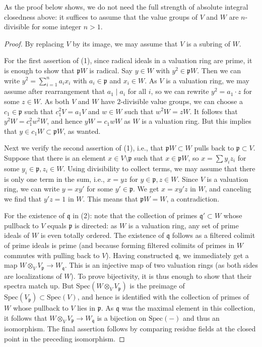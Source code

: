 \documentclass[reqno]{amsart}
\theoremstyle{definition}
\begin{document}
As the proof below shows, we do not need the full strength of absolute integral closedness above: it suffices to assume that the value groups of $V$ and $W$ are $n$-divisible for some integer $n > 1$. 

\begin{proof}
By replacing $V$ by its image, we may assume that $V$ is a subring of $W$. 

For the first assertion of (1), since radical ideals in a valuation ring are prime, it is enough to
show that $\mathfrak{p}W$ is radical. Say $y \in W$ with $y^2 \in
\mathfrak{p}W$. Then we can write $y^2 = \sum_{i=1}^n a_i x_i$ with $a_i \in
\mathfrak{p}$ and $x_i \in W$. As $V$ is a valuation ring, we may assume after
rearrangement that $a_1 \mid a_i$ for all $i$, so we can rewrite $y^2 = a_1
\cdot z$ for some $z \in W$. As both $V$ and $W$ have $2$-divisible value
groups, we can choose a $c_1 \in \mathfrak{p}$ such that $c_1^2V = a_1V$ and $w
\in W$ such that $w^2W = zW$. It follows that $y^2 W = c_1^2 w^2W$, and hence
$yW = c_1w W$ as $W$ is a valuation ring. But this implies that $y \in c_1W \subset \mathfrak{p}W$, as wanted.

Next we verify the second assertion of (1), i.e., that $\mathfrak{p} W \subset W$ pulls back to $\mathfrak{p}
\subset V$. 
Suppose that  there is an element $x \in V\setminus \mathfrak{p}$ such that $x \in \mathfrak{p}
W$, so $x = \sum y_i z_i$ for some $y_i \in \mathfrak{p}, z_i \in W$. Using
divisibility to collect terms, we may assume that there is only one term in the
sum, i.e., $x = yz$ for $y \in \mathfrak{p}, z \in W$. 
Since $V$ is a valuation ring,  we can write $y = x y'$ for some
$y'  \in \mathfrak{p}$. 
We get $x = xy' z$ in $W$, and canceling we find that $y' z = 1$ in $W$. This
means that $\mathfrak{p} W = W$, a contradiction. 


For the existence of $\mathfrak{q}$  in (2): note that the collection of primes
$\mathfrak{q}' \subset W$ whose pullback to $V$ equals $\mathfrak{p}$ is
directed: as $W$ is a valuation ring, any set of prime ideals of $W$ is even
totally ordered. The existence of $\mathfrak{q}$ follows as a filtered colimit
of prime ideals is prime (and because forming filtered colimits of primes in $W$
commutes with pulling back to $V$). Having constructed $\mathfrak{q}$, we
immediately get a map $W \otimes_V V_{\mathfrak{p}} \to W_{\mathfrak{q}}$. This
is an injective map of two valuation rings (as both sides are localizations of
$W$). To prove bijectivity, it is thus enough to show that their spectra match
up. But $\mathrm{Spec}(W \otimes_V V_{\mathfrak{p}})$ is the preimage of
$\mathrm{Spec}(V_{\mathfrak{p}}) \subset \mathrm{Spec}(V)$, and hence is
identified with the collection of primes of $W$ whose pullback to $V$
lies in $\mathfrak{p}$. As $\mathfrak{q}$ was the maximal element in this collection, it follows that $W \otimes_V V_{\mathfrak{p}} \to W_{\mathfrak{q}}$ is a bijection on $\mathrm{Spec}(-)$ and thus an isomorphism. The final assertion follows by comparing residue fields at the closed point in the preceding isomorphism.
\end{proof}
\end{document}
